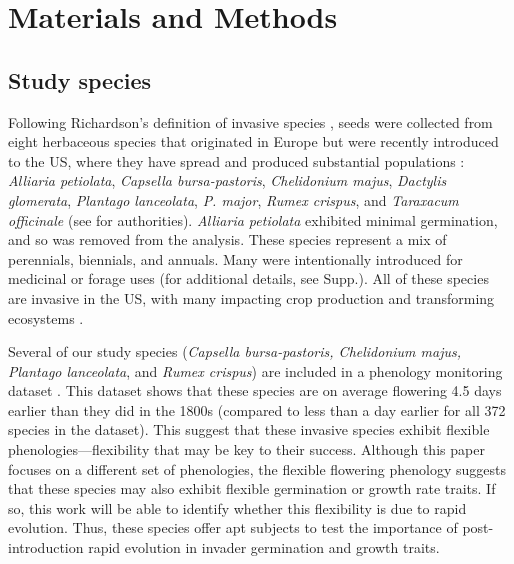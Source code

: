 \documentclass[12pt]{article}\usepackage[]{graphicx}\usepackage[]{color}
\begin{document}
	\section{Materials and Methods}
	\subsection{Study species}
	Following Richardson's definition of invasive species \parencite[][, see Supp. for details]{Richardson2000, Richardson2011}, seeds were collected from eight herbaceous species that originated in Europe but were recently introduced to the US, where they have spread and produced substantial populations \parencite{Uva1997}:\textit{ Alliaria petiolata}, \textit{Capsella bursa-pastoris}, \textit{Chelidonium majus}, \textit{Dactylis glomerata},  \textit{Plantago lanceolata}, \textit{P.  major}, \textit{Rumex crispus}, and \textit{Taraxacum officinale} (see \textcite{Haines2011} for authorities). \textit{Alliaria petiolata} exhibited minimal germination, and so was removed from the analysis. These species represent a mix of perennials, biennials, and annuals. Many were intentionally introduced for medicinal or forage uses (for additional details, see Supp.).  All of these species are invasive in the US, with many impacting crop production and transforming ecosystems \parencite[e.g.,][]{Froese2003,Wolfe2008}. 

Several of our study species (\textit{Capsella bursa-pastoris, Chelidonium majus, Plantago lanceolata}, and \textit{Rumex crispus}) are included in a phenology monitoring dataset \parencite[the Concord Phenology Dataset,][]{Willis:2008bf}. This dataset shows that these species  are on average flowering 4.5 days earlier than they did in the 1800s (compared to less than a day earlier for all 372 species in the dataset). This suggest that these invasive species exhibit flexible phenologies---flexibility that may be key to their success. Although this paper focuses on a different set of phenologies, the flexible flowering phenology suggests that these species may also exhibit flexible germination or growth rate traits. If so, this work will be able to identify whether this flexibility is due to rapid evolution. Thus, these species offer apt subjects to test the importance of post-introduction rapid evolution in invader germination and growth traits. %
\end{document}
